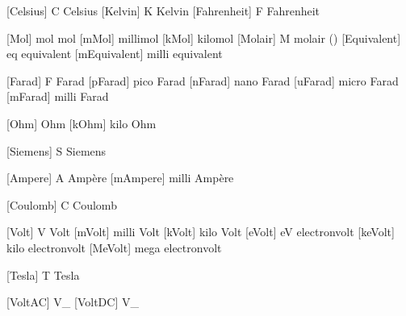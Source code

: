 
 [Celsius]    {C} {Celsius}
 [Kelvin]     {K} {Kelvin}
 [Fahrenheit] {F} {Fahrenheit}


 [Mol]         {mol}                {mol}
 [mMol]        {\Milli \Mol}        {millimol}
 [kMol]        {\Kilo  \Mol}        {kilomol}
 [Molair]      {M}                  {molair (\Mol \Per \Liter)}
 [Equivalent]  {eq}                 {equivalent}
 [mEquivalent] {\Milli \Equivalent} {milli equivalent}


 [Farad]   {F}             {Farad}
 [pFarad]  {\Pico  \Farad} {pico Farad}
 [nFarad]  {\Nano  \Farad} {nano Farad}
 [uFarad]  {\Micro \Farad} {micro Farad}
 [mFarad]  {\Milli \Farad} {milli Farad}

 [Ohm]     {\Omega}        {Ohm}
 [kOhm]    {\Kilo \Ohm}    {kilo Ohm}

 [Siemens] {S}              {Siemens}

 [Ampere]  {A}              {Amp\`ere}
 [mAmpere] {\Milli \Ampere} {milli Amp\`ere}

 [Coulomb] {C}              {Coulomb}

 [Volt]    {V}              {Volt}
 [mVolt]   {\Milli \Volt}   {milli Volt}
 [kVolt]   {\Kilo  \Volt}   {kilo Volt}
 [eVolt]   {eV}             {electronvolt}
 [keVolt]  {\Kilo \eVolt}   {kilo electronvolt}
 [MeVolt]  {\Mega \eVolt}   {mega electronvolt}

 [Tesla]   {T}              {Tesla}

 [VoltAC]  {V_{}}  {}
 [VoltDC]  {V_{}}  {}

\setuplabeltext
  [\s!nl]
  [u:vac=wisselspanning,
   u:vdc=gelijkspanning]

\setuplabeltext
  [\s!en]
  [u:vac=alternating current,
   u:vdc=direct current]

